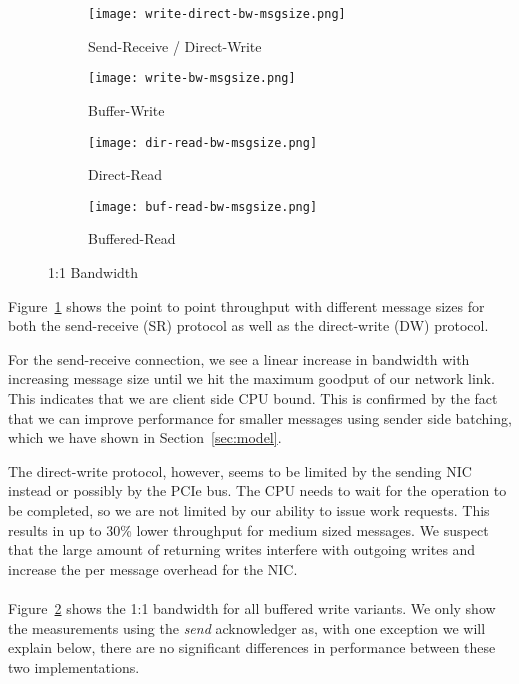 \begin{figure}[htp]
\begin{subfigure}[b]{0.49\textwidth}
  \centering
  \texttt{[image: write-direct-bw-msgsize.png]}
  \caption{Send-Receive / Direct-Write}
  \label{fig:plot-sr-dw-bw}
\end{subfigure}
\begin{subfigure}[b]{0.49\textwidth}
  \centering
  \texttt{[image: write-bw-msgsize.png]}
  \caption{Buffer-Write}
  \label{fig:plot-bw-bw}
\end{subfigure}
\begin{subfigure}[b]{0.49\textwidth}
  \centering
  \texttt{[image: dir-read-bw-msgsize.png]}
  \caption{Direct-Read}
  \label{fig:plot-dr-bw}
\end{subfigure}
\begin{subfigure}[b]{0.57\textwidth}
  \centering
  \texttt{[image: buf-read-bw-msgsize.png]}
  \caption{Buffered-Read}
  \label{fig:plot-br-bw}
\end{subfigure}
  \caption{1:1 Bandwidth}
  \label{fig:plot-bw}
\end{figure}

Figure~\ref{fig:plot-sr-dw-bw} shows the point to point throughput with different message sizes for both the send-receive (SR)
protocol as well as the direct-write (DW) protocol. 

For the send-receive connection, we see a linear increase in bandwidth with increasing message size until we hit the
maximum goodput of our network link. This indicates that we are client side CPU bound. This is confirmed by the fact that we can
improve performance for smaller messages using sender side batching, which we have shown in Section~\ref{sec:model}.

The direct-write protocol, however, seems to be limited by the sending NIC instead or possibly by the PCIe bus. The CPU needs
to wait for the operation to be completed, so we are not limited by our ability to issue work requests. 
This results in up to 30\% lower throughput for medium sized messages. We suspect that the large 
amount of returning writes interfere with outgoing writes and increase the per message overhead for the NIC. 


\paragraph{} Figure~\ref{fig:plot-bw-bw} shows the 1:1 bandwidth for all buffered write variants. We only show the measurements
using the \emph{send} acknowledger as, with one exception we will explain below, there are no significant differences
in performance between these two implementations.

